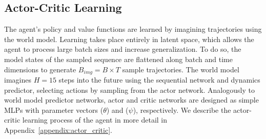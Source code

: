 \subsection{Actor-Critic Learning}

The agent’s policy and value functions are learned by imagining trajectories using the world model. Learning takes place entirely in latent space, which allows the agent to process large batch sizes and increase generalization. To do so, the model states of the sampled sequence are flattened along batch and time dimensions to generate $B_{img} = B \times T$ sample trajectories. The world model imagines $H = 15$ steps into the future using the sequential network and dynamics predictor, selecting actions by sampling from the actor network. Analogously to world model predictor networks, actor and critic networks are designed as simple MLPs with parameter vectors ($\theta$) and ($\psi$), respectively. We describe the actor-critic learning process of the agent in more detail in Appendix~\ref{appendix:actor_critic}.